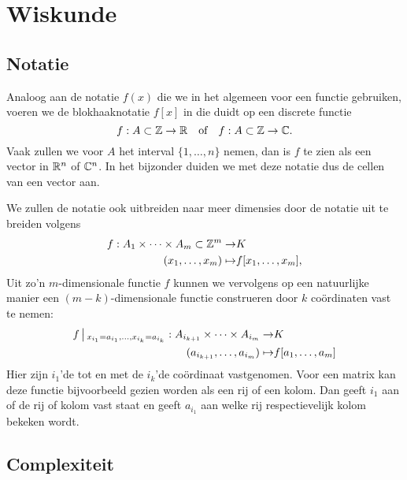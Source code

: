\section{Wiskunde}

\subsection{Notatie}
Analoog aan de notatie $f(x)$ die we in het algemeen voor een functie gebruiken, voeren we de blokhaaknotatie $f[x]$ in die duidt op een discrete functie
\[
f:A\subset \mathbb{Z}\to \mathbb{R} \text{\quad of\quad} f:A\subset \mathbb{Z}\to \mathbb{C}.  
\]
Vaak zullen we voor $A$ het interval $\{1,\ldots,n\}$ nemen, 
dan is $f$ te zien als een vector in $\mathbb{R}^n$ of $\mathbb{C}^n$.
In het bijzonder duiden we met deze notatie dus de cellen van een vector aan.

We zullen de notatie ook uitbreiden naar meer dimensies door de notatie uit te breiden volgens
\begin{equation*}
\begin{split}
f: A_1\times \cdots \times A_m\subset \mathbb{Z}^m \to& K \\
       (x_1,\ldots,x_m) \mapsto& f[x_1,\ldots,x_m],
\end{split}
\end{equation*}
Uit zo'n $m$-dimensionale functie $f$ kunnen we vervolgens op een natuurlijke manier een \mbox{$(m-k)$-dimensionale}
functie construeren door $k$ co\"ordinaten vast te nemen:
\begin{equation*}
\begin{split}
f\,\big|\,_{x_{i_1}=a_{i_1},\ldots,x_{i_k}=a_{i_k}}: A_{i_{k+1}}\times\cdots\times A_{i_{m}} \to& K \\
(a_{i_{k+1}},\ldots,a_{i_{m}}) \mapsto& f[a_1,\ldots,a_m]
\end{split}
\end{equation*}
Hier zijn $i_1$'de tot en met de $i_k$'de co\"ordinaat vastgenomen. Voor een matrix kan deze functie
bijvoorbeeld gezien worden als een rij of een kolom. Dan geeft $i_1$ aan of de rij of kolom
vast staat en geeft $a_{i_1}$ aan welke rij respectievelijk kolom bekeken wordt.

\subsection{Complexiteit}

